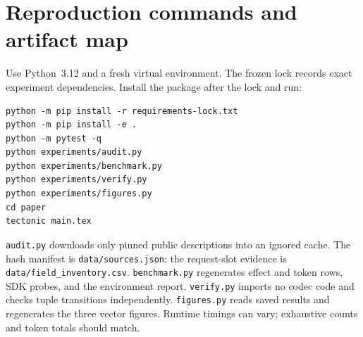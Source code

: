 \documentclass[10pt,twocolumn]{article}
\begin{document}


\appendix
\section{Reproduction commands and artifact map}\label{app:commands}
Use Python~3.12 and a fresh virtual environment. The frozen lock records exact experiment dependencies. Install the package after the lock and run:
\begin{lstlisting}
python -m pip install -r requirements-lock.txt
python -m pip install -e .
python -m pytest -q
python experiments/audit.py
python experiments/benchmark.py
python experiments/verify.py
python experiments/figures.py
cd paper
tectonic main.tex
\end{lstlisting}
\texttt{audit.py} downloads only pinned public descriptions into an ignored cache. The hash manifest is \texttt{data/sources.json}; the request-slot evidence is \texttt{data/field\_inventory.csv}. \texttt{benchmark.py} regenerates effect and token rows, SDK probes, and the environment report. \texttt{verify.py} imports no codec code and checks tuple transitions independently. \texttt{figures.py} reads saved results and regenerates the three vector figures. Runtime timings can vary; exhaustive counts and token totals should match.
\end{document}
